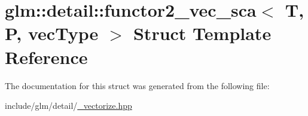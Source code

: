 \hypertarget{structglm_1_1detail_1_1functor2__vec__sca}{}\section{glm\+:\+:detail\+:\+:functor2\+\_\+vec\+\_\+sca$<$ T, P, vec\+Type $>$ Struct Template Reference}
\label{structglm_1_1detail_1_1functor2__vec__sca}


The documentation for this struct was generated from the following file\+:\begin{DoxyCompactItemize}
\item 
include/glm/detail/\hyperlink{__vectorize_8hpp}{\+\_\+vectorize.\+hpp}\end{DoxyCompactItemize}
